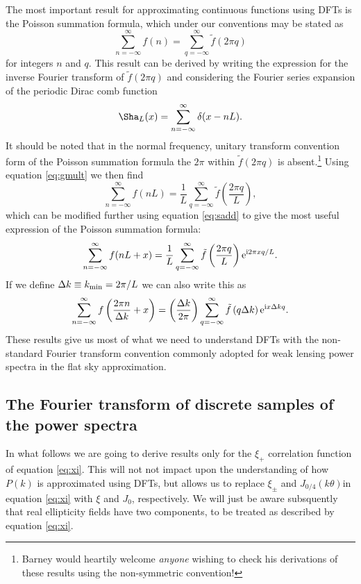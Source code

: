 \documentclass[preprint]{aastex}
\newcommand{\mi}{{\rm i}}
\newcommand{\me}{{\rm e}}
\begin{document}
The most important result for approximating continuous functions using
DFTs is the Poisson summation formula, which under our conventions may
be stated as
\begin{equation}
\sum_{n=-\infty}^{\infty} f(n) = \sum_{q=-\infty}^{\infty} \tilde{f}(2
\pi q)
\end{equation}
for integers $n$ and $q$.  This result can be derived by writing the
  expression for the inverse Fourier transform of $\tilde{f}(2 \pi
q)$ and considering the Fourier series expansion of the periodic Dirac comb
function
\begin{equation}
\Sha_L (x) = \sum_{n=-\infty}^{\infty} \delta(x - nL).
\end{equation}
It should be noted that in the normal frequency, unitary transform
convention form of the Poisson summation formula the $2\pi$ within $\tilde{f}(2 \pi
q)$ is absent.\footnote{Barney would heartily welcome \emph{anyone} wishing to
check his derivations of these results using the non-symmetric
convention!}  Using equation \eqref{eq:gmult} we then find
\begin{equation}
\sum_{n=-\infty}^{\infty} f(n L) = \frac{1}{L}
\sum_{q=-\infty}^{\infty} \tilde{f} \left(\frac{2 \pi q}{L} \right),
\end{equation}
which can be modified further using equation \eqref{eq:sadd} to give
the most useful expression of the Poisson summation formula:
\begin{equation}
\sum_{n=-\infty}^{\infty} f(n L + x) = \frac{1}{L}
\sum_{q=-\infty}^{\infty} \tilde{f} \left(\frac{2 \pi  q}{L} \right)
\me^{\mi 2 \pi x q / L}.
\end{equation}
If we define $\Delta k \equiv k_{\rm min} = 2 \pi / L$ we can also write
this as
\begin{equation}
\sum_{n=-\infty}^{\infty} f\left(\frac{2\pi n}{\Delta k} + x \right) = 
\left(\frac{\Delta k}{2 \pi} \right)
\sum_{q=-\infty}^{\infty} \tilde{f} \left(q \Delta k \right)
\me^{\mi x \Delta k q }. \label{eq:poisson}
\end{equation}
These results give us most of what we need to understand DFTs with the
non-standard Fourier transform convention commonly adopted for weak
lensing power spectra in the flat sky approximation.

\subsection{The Fourier transform of discrete samples of the power spectra}\label{sect:DFTPS}
In what follows we are going to derive results only for the $\xi_+$
correlation function of equation \eqref{eq:xi}.  This will not
not impact upon the understanding of how $P(k)$ is approximated using DFTs,
but allows us to replace $\xi_{\pm}$ and $J_{0/4}(k \theta) $in
equation \eqref{eq:xi} with $\xi$ and $J_0$, respectively.  We will
just be aware subsquently that real ellipticity fields have two
components, to be treated as described by equation \eqref{eq:xi}.
\end{document}

